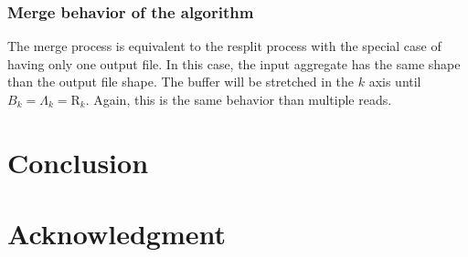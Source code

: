 \documentclass[conference]{IEEEtran}
\begin{document}
\subsubsection{Merge behavior of the algorithm}
The merge process is equivalent to the resplit process with the special case of having only one output file.
In this case, the input aggregate has the same shape than the output file shape.
The buffer will be stretched in the $k$ axis until $B_k = \Lambda_k = \textrm{R}_k$.
Again, this is the same behavior than multiple reads.

\section*{Conclusion}

\section*{Acknowledgment}



\end{document}
